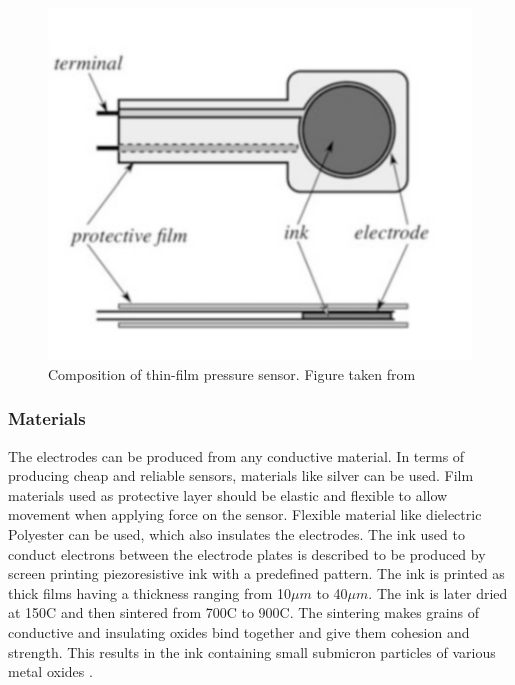 \begin{figure}[!b]
    \centering
    \includegraphics[scale=0.75]{figures/sensorconstruction.png}
    \caption{Composition of thin-film pressure sensor. Figure taken from \cite[p.418]{handbook}}
    \label{fig:sensorconstruction}
\end{figure}

\subsubsection{Materials}
\label{subsec:materials}
The electrodes can be produced from any conductive material. In terms of producing cheap and reliable sensors, materials like silver can be used. Film materials used as protective layer should be elastic and flexible to allow movement when applying force on the sensor. Flexible material like dielectric Polyester can be used, which also insulates the electrodes. The ink used to conduct electrons between the electrode plates is described to be produced by screen printing piezoresistive ink with a predefined pattern. The ink is printed as thick films having a thickness ranging from 10$\mu m$ to 40$\mu m$. The ink is later dried at 150\textdegree C and then sintered from 700\textdegree C to 900\textdegree C. The sintering makes grains of conductive and insulating oxides bind together and give them cohesion and strength. This results in the ink containing small submicron particles of various metal oxides \citep[10.3, p.418]{handbook}.

